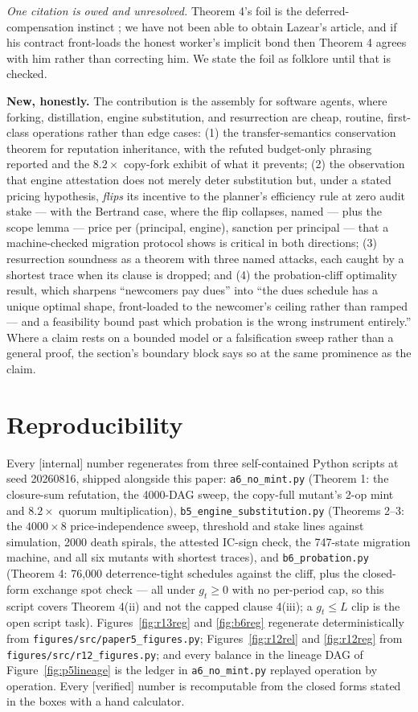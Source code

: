 \documentclass[11pt,a4paper]{article}
\begin{document}
\emph{One citation is owed and unresolved.} Theorem 4's foil is the deferred-compensation instinct \cite{lazear}; we have not
been able to obtain Lazear's article, and if his contract front-loads the honest worker's implicit bond then Theorem 4 agrees
with him rather than correcting him. We state the foil as folklore until that is checked.

\textbf{New, honestly.} The contribution is the assembly for software agents, where forking, distillation, engine substitution,
and resurrection are cheap, routine, first-class operations rather than edge cases: (1) the transfer-semantics conservation
theorem for reputation inheritance, with the refuted budget-only phrasing reported and the $8.2\times$ copy-fork exhibit of what it
prevents; (2) the observation that engine attestation does not merely deter substitution but, under a stated pricing hypothesis,
\emph{flips} its incentive to the planner's efficiency rule at zero audit stake --- with the Bertrand case, where the flip
collapses, named --- plus the scope lemma --- price per (principal, engine), sanction per principal ---
that a machine-checked migration protocol shows is critical in both directions; (3) resurrection soundness as a theorem with
three named attacks, each caught by a shortest trace when its clause is dropped; and (4) the probation-cliff optimality result,
which sharpens ``newcomers pay dues'' into ``the dues schedule has a unique optimal shape, front-loaded to the newcomer's ceiling
rather than ramped --- and a feasibility bound past which probation is the wrong instrument entirely.'' Where a claim
rests on a bounded model or a falsification sweep rather than a general proof, the section's boundary block says so at the same
prominence as the claim.

\section*{Reproducibility}

Every [internal] number regenerates from three self-contained Python scripts at seed 20260816, shipped alongside this paper:
\texttt{a6\_no\_mint.py} (Theorem 1: the closure-sum refutation, the 4000-DAG sweep, the copy-full mutant's 2-op mint and
$8.2\times$ quorum multiplication), \texttt{b5\_engine\_substitution.py} (Theorems 2--3: the $4000\times 8$ price-independence
sweep, threshold and stake lines against simulation, 2000 death spirals, the attested IC-sign check, the 747-state migration
machine, and all six mutants with shortest traces), and \texttt{b6\_probation.py} (Theorem 4: 76{,}000 deterrence-tight schedules
against the cliff, plus the closed-form exchange spot check --- all under $g_t\ge0$ with no per-period cap, so this script covers
Theorem 4(ii) and not the capped clause 4(iii); a $g_t\le L$ clip is the open script task). Figures~\ref{fig:r13reg} and \ref{fig:b6reg} regenerate deterministically from
\texttt{figures/src/paper5\_figures.py}; Figures~\ref{fig:r12rel} and \ref{fig:r12reg} from
\texttt{figures/src/r12\_figures.py}; and every balance in the lineage DAG of Figure~\ref{fig:p5lineage} is the ledger in
\texttt{a6\_no\_mint.py} replayed operation by operation. Every [verified]
number is recomputable from the closed forms stated in the boxes with a hand calculator.
\end{document}
